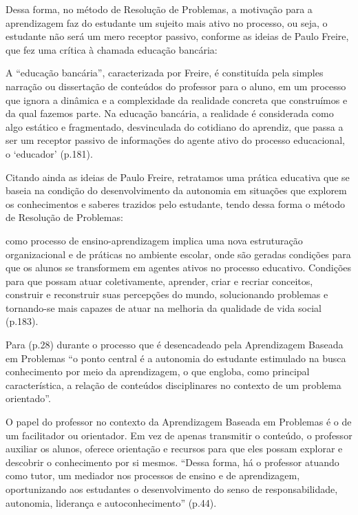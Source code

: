 Dessa forma, no método de Resolução de Problemas, a motivação para a aprendizagem faz do estudante um sujeito mais ativo no processo, ou seja, o estudante não será um mero receptor passivo, conforme as ideias de Paulo Freire, que fez uma crítica à chamada educação bancária:

\begin{citacao}
    A ``educação bancária'', caracterizada por Freire, é constituída pela simples narração ou dissertação de conteúdos do professor para o aluno, em um processo que ignora a dinâmica e a complexidade da realidade concreta que construímos e da qual fazemos parte. Na educação bancária, a realidade é considerada como algo estático e fragmentado, desvinculada do cotidiano do aprendiz, que passa a ser um receptor passivo de informações do agente ativo do processo educacional, o `educador' \cite{PIERINI2019} (p.181).
\end{citacao}

Citando ainda as ideias de Paulo Freire, retratamos uma prática educativa que se baseia na condição do desenvolvimento da autonomia em situações que explorem os conhecimentos e saberes trazidos pelo estudante, tendo dessa forma o método de Resolução de Problemas:

\begin{citacao}[portuguese]
    [...] como processo de ensino-aprendizagem implica uma nova estruturação organizacional e de práticas no ambiente escolar, onde são geradas condições para que os alunos se transformem em agentes ativos no processo educativo. Condições para que possam atuar coletivamente, aprender, criar e recriar conceitos, construir e reconstruir suas percepções do mundo, solucionando problemas e tornando-se mais capazes de atuar na melhoria da qualidade de vida social \cite{PIERINI2019} (p.183).
\end{citacao}

Para  (p.28) durante o processo que é desencadeado pela Aprendizagem Baseada em Problemas ``o ponto central é a autonomia do estudante estimulado na busca conhecimento por meio da aprendizagem, o que engloba, como principal característica, a relação de conteúdos disciplinares no contexto de um problema orientado''.

O papel do professor no contexto da Aprendizagem Baseada em Problemas é o de um facilitador ou orientador. Em vez de apenas transmitir o conteúdo, o professor auxiliar os alunos, oferece orientação e recursos para que eles possam explorar e descobrir o conhecimento por si mesmos. ``Dessa forma, há o professor atuando como tutor, um mediador nos processos de ensino e de aprendizagem, oportunizando aos estudantes o desenvolvimento do senso de responsabilidade, autonomia, liderança e autoconhecimento'' \cite{NUNES2022} (p.44).

